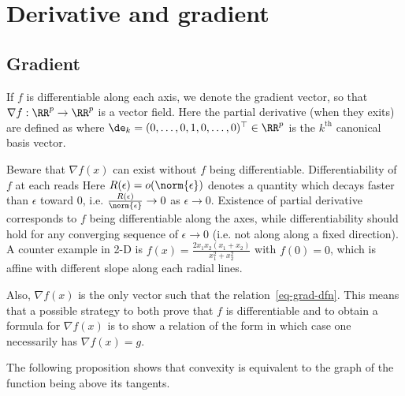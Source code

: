 \section{Derivative and gradient}

\subsection{Gradient}


If $f$ is differentiable along each axis, we denote 
the gradient vector, so that $\nabla f : \RR^p \rightarrow \RR^p$ is a vector field. Here the partial derivative (when they exits) are defined as
where $\de_k=(0,\ldots,0,1,0,\ldots,0)^\top \in \RR^p$ is the $k^{\text{th}}$ canonical basis vector.  

Beware that $\nabla f(x)$ can exist without $f$ being differentiable. Differentiability of $f$ at each reads
%
Here $R(\epsilon) = o(\norm{\epsilon})$ denotes a quantity which decays faster than $\epsilon$ toward $0$, i.e. $\frac{R(\epsilon)}{\norm{\epsilon}} \rightarrow 0$ as $\epsilon \rightarrow 0$. Existence of partial derivative corresponds to $f$ being differentiable along the axes, while differentiability should hold for any converging sequence of $\epsilon\rightarrow 0$ (i.e. not along along a fixed direction). 
%
A counter example in 2-D is $f(x)=\frac{2 x_1 x_2 (x_1+x_2)}{x_1^2+x_2^2}$ with $f(0)=0$, which is affine with different slope along each radial lines.

Also, $\nabla f(x)$ is the only vector such that the relation~\eqref{eq-grad-dfn}. This means that a possible strategy to both prove that $f$ is differentiable and to obtain a formula for $\nabla f(x)$ is to show a relation of the form 
in which case one necessarily has $\nabla f(x)=g$. 

The following proposition shows that convexity is equivalent to the graph of the function being above its tangents.

